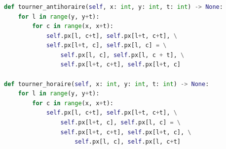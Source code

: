 \documentclass[svgnames,11pt]{beamer}
\begin{document}
\begin{frame}[fragile]
    \frametitle{}

\begin{center}
\begin{lstlisting}[language=Python , basicstyle=\ttfamily\small, xleftmargin=0.1em, xrightmargin=-0.4em]
def tourner_antihoraire(self, x: int, y: int, t: int) -> None:
    for l in range(y, y+t):
        for c in range(x, x+t):
            self.px[l, c+t], self.px[l+t, c+t], \
            self.px[l+t, c], self.px[l, c] = \
                self.px[l, c], self.px[l, c + t], \
                self.px[l+t, c+t], self.px[l+t, c]

def tourner_horaire(self, x: int, y: int, t: int) -> None:
    for l in range(y, y+t):
        for c in range(x, x+t):
            self.px[l, c+t], self.px[l+t, c+t], \
                self.px[l+t, c], self.px[l, c] = \
                self.px[l+t, c+t], self.px[l+t, c], \
                    self.px[l, c], self.px[l, c+t]
\end{lstlisting}
\captionof{code}{Tourner}
\label{CODE}
\end{center}  

\end{frame}
\end{document}
